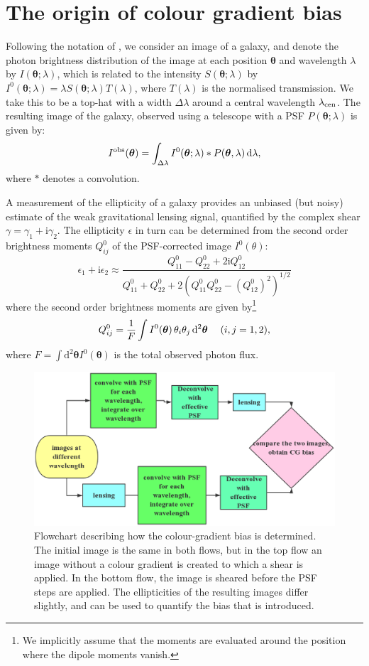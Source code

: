 \documentclass[useAMS,usenatbib]{mnras}
\renewcommand{\d}{\mathrm{d}}
\newcommand{\ii}{\mathrm{i}}
\newcommand{\be}{\begin{equation}}
\newcommand{\ee}{\end{equation}}
\def\elabel#1{\label{eq:#1}}
\begin{document}
\section{The origin of colour gradient bias}
\label{sec:concepts}

Following the notation of , we consider an image of a galaxy, and denote the photon brightness
distribution of the image at each position $\bm \theta$ and wavelength $\lambda$ by $I({\bm \theta};\lambda)$, which is related to the intensity $S({\bm\theta};\lambda)$ by $I^0({\bm\theta};\lambda)=\lambda S({\bm\theta};\lambda)
T(\lambda)$, where $T(\lambda)$ is the normalised transmission. We take this to be a top-hat with a
width $\Delta\lambda$ around a central wavelength $\lambda_{\rm cen}$. The resulting image of the galaxy, observed using a telescope with a PSF $P({\bm \theta};\lambda)$  is given by:
%
\be
I^{\rm obs}({\bm\theta}) = \int_{\Delta\lambda} I^0({\bm\theta}; \lambda) *
P({\bm \theta},\lambda)\, \d \lambda,
\label{eq:iobs}
\ee
%
where $*$ denotes a convolution.

A measurement of the ellipticity of a galaxy provides an unbiased (but noisy) estimate of the
weak gravitational lensing signal, quantified by the complex shear $\gamma=\gamma_1+\ii\gamma_2$.
The ellipticity $\epsilon$ in turn can be determined from the second order brightness moments $Q^0_{ij}$ of the PSF-corrected image $I^0(\theta)$:
%
\be
\epsilon_1+\ii \epsilon_2 \approx \frac{Q^0_{11} - Q^0_{22} + 2 \ii Q^0_{12} }
{Q^0_{11} + Q^0_{22} +2(Q^0_{11}Q^0_{22} - (Q^0_{12})^2)^{1/2}}
\elabel{mshear}
\ee
%
where the second order brightness moments are given by\footnote{We implicitly assume that the moments are evaluated around the position where the dipole moments vanish.}
%
\be
Q^0_{ij} = {1 \over F} \int  I^{0}({\bm \theta})\, \theta_i \theta_j \, \d^2 {\bm \theta} \quad\; (i,j=1,2),
\ee
%
where $F=\int \d^2{{\bm\theta}}  I^{0}({\bm\theta})$ is the total observed photon flux.

%
\begin{figure}
\includegraphics[width=12.5cm]{colourg.eps}
\caption{Flowchart describing how the colour-gradient bias is determined. The initial image
is the same in both flows, but in the top flow an image without a colour gradient is created
to which a shear is applied. In the bottom flow, the image is sheared before the PSF steps
are applied. The ellipticities of the resulting images differ slightly, and can be used to quantify
the bias that is introduced.}
\label{fig:flowchart}
\end{figure}
%
\end{document}
